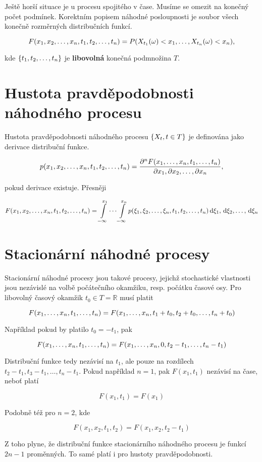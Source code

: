 Ještě horší situace je u procesu spojitého v čase. Musíme se omezit na konečný počet podmínek. Korektním popisem náhodné posloupnosti je soubor všech konečně rozměrných distribučních funkcí.

\[ F(\vecrow[x],\vecrow[t])=P(X_{t_1}(\omega)<x_1,\ldots, X_{t_n}(\omega)<x_n), \]

kde $\brs{\vecrow[t]}$ je \textbf{libovolná} konečná podmnožina $T$.

\section{Hustota pravděpodobnosti náhodného procesu}
Hustota pravděpodobnosti náhodného procesu $\brs{X_t,t\in T}$ je definována jako derivace distribuční funkce.

\[ p(\vecrow[x],\vecrow[t])=\frac{\partial^n F(\svecrow[x],\svecrow[t])}{\vecrow[\partial x]}, \]

pokud derivace existuje. Přesněji

\[ F(\vecrow[x],\vecrow[t])=\int\limits_{-\infty}^{x_1}\cdots\int\limits_{-\infty}^{x_n}p(\vecrow[\xi],\vecrow[t])\vecrow[\d\xi] \]

\section{Stacionární náhodné procesy}
Stacionární náhodné procesy jsou takové procesy, jejichž stochastické vlastnosti jsou nezávislé na volbě počátečního okamžiku, resp. počátku časové osy. Pro libovolný časový okamžik $t_0\in T=\mathbb{R}$ musí platit

\[ F(\svecrow[x],\svecrow[t])=F(\svecrow[x],t_1+t_0,t_2+t_0,\ldots,t_n+t_0) \]

Například pokud by platilo $t_0=-t_1$, pak 

\[ F(\svecrow[x],\svecrow[t])=F(\svecrow[x],0,t_2-t_1,\ldots,t_n-t_1) \]

Distribuční funkce tedy nezávisí na $t_1$, ale pouze na rozdílech $t_2-t_1,t_3-t_1,\ldots,t_n-t_1$. Pokud například $n=1$, pak $F(x_1,t_1)$ nezávisí na čase, neboť platí 

\[ F(x_1,t_1)=F(x_1) \]

Podobně též pro $n=2$, kde

\[ F(x_1,x_2,t_1,t_2)=F(x_1,x_2,t_2-t_1) \]

Z toho plyne, že distribuční funkce stacionárního náhodného procesu je funkcí $2n-1$ proměnných. To samé platí i pro hustoty pravděpodobnosti.

